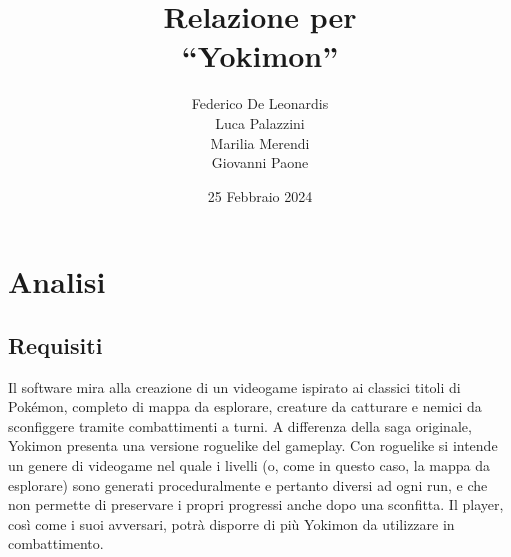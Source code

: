 \documentclass[a4paper,12pt]{report}
\title{\textbf{Relazione per\\``Yokimon''}}
\author{Federico De Leonardis\\Luca Palazzini\\Marilia Merendi\\Giovanni Paone}
\date{25 Febbraio 2024}
\begin{document}
\maketitle
\tableofcontents
\chapter{Analisi}
\section{Requisiti}
Il software mira alla creazione di un videogame ispirato ai classici titoli di Pokémon, completo di mappa da esplorare, creature da catturare e nemici da sconfiggere tramite combattimenti a turni. A differenza della saga originale, Yokimon presenta una versione roguelike del gameplay. 
%
Con roguelike si intende un genere di videogame nel quale i livelli (o, come in questo caso, la mappa da esplorare) sono generati proceduralmente e pertanto diversi ad ogni run, e che non permette di preservare i propri progressi anche dopo una sconfitta. 
%
Il player, così come i suoi avversari, potrà disporre di più Yokimon da utilizzare in combattimento.
\end{document}
